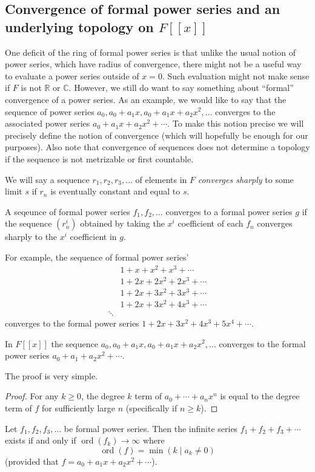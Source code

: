 \subsection{Convergence of formal power series and an underlying topology on $F[[x]]$}

One deficit of the ring of formal power series is that unlike the usual notion of power series, which have radius of convergence, there might not be a useful way to evaluate a power series outside of $x = 0$. Such evaluation might not make sense if $F$ is not $\mathbb{R}$ or $\mathbb{C}$. However, we still do want to say something about ``formal'' convergence of a power series. As an example, we would like to say that the sequence of power series $a_0, a_0 + a_1x, a_0 + a_1x + a_2x^2, \dots$ converges to the associated power series $a_0 + a_1x + a_2x^2 + \cdots$. To make this notion precise we will precisely define the notion of convergence (which will hopefully be enough for our purposes). Also note that convergence of sequences does not determine a topology if the sequence is not metrizable or first countable. 

\begin{definition}
We will say a sequence $r_1, r_2, r_3, \dots$ of elements in $F$ \textit{converges sharply} to some limit $s$ if $r_n$ is eventually constant and equal to $s$.
\end{definition}

\begin{definition}
A seqeunce of formal power series $f_1, f_2, \dots$ converges to a formal power series $g$ if the sequence $(r_n^i)$ obtained by taking the $x^i$ coefficient of each $f_n$ converges sharply to the $x^i$ coefficient in $g$.
\end{definition}

For example, the sequence of formal power series'
\begin{align*}
&1 + x + x^2 + x^3 + \cdots \\
&1 + 2x + 2x^2 + 2x^3 + \cdots \\
&1 + 2x + 3x^2 + 3x^3 + \cdots \\
&1 + 2x + 3x^2 + 4x^3 + \cdots \\
\ddots
\end{align*}
converges to the formal power series $1 + 2x + 3x^2 + 4x^3 + 5x^4 + \cdots$. 

\begin{lemma}
In $F[[x]]$ the sequence $a_0, a_0 + a_1x, a_0 + a_1x + a_2x^2, \dots$ converges to the formal power series $a_0 + a_1 + a_2x^2 + \cdots$.
\end{lemma}
The proof is very simple.
\begin{proof}
For any $k \geq 0$, the degree $k$ term of $a_0 + \cdots + a_nx^n$ is equal to the degree term of $f$ for sufficiently large $n$ (specifically if $n \geq k$).
\end{proof}

\begin{theorem}
Let $f_1, f_2, f_3, \dots$ be formal power series. Then the infinite series $f_1 + f_2 + f_3 + \cdots$ exists if and only if $\operatorname{ord}(f_k) \to \infty$ where 
\[\operatorname{ord}(f) = \min(k \mid a_k \neq 0)\] (provided that $f = a_0 + a_1x + a_2x^2 + \cdots$).
\end{theorem}